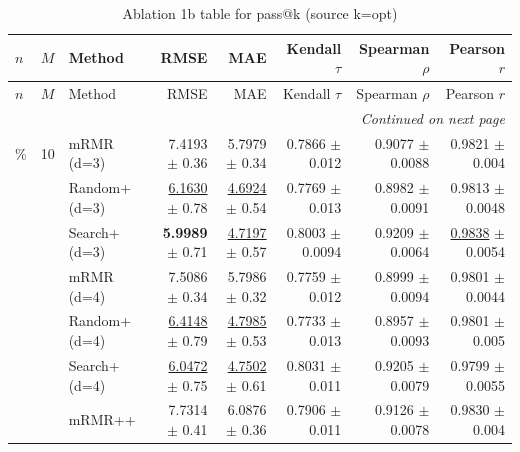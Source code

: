 \footnotesize
\setlength{\tabcolsep}{2pt}
\renewcommand{\arraystretch}{1.05}
\setlength{\LTpre}{0pt}
\setlength{\LTpost}{0pt}
\setlength{\LTleft}{\fill}
\setlength{\LTright}{\fill}
\begin{longtable}{llp{}rrrrr}
\caption{Ablation 1b table for pass@k (source k=opt)}\label{tab:ablation\_1b\_passk\_kopt}\\
\toprule
$n$ & $M$ & Method & RMSE & MAE & Kendall $\tau$ & Spearman $\rho$ & Pearson $r$ \\
\midrule
\endfirsthead
\toprule
$n$ & $M$ & Method & RMSE & MAE & Kendall $\tau$ & Spearman $\rho$ & Pearson $r$ \\
\midrule
\endhead
\midrule
\multicolumn{8}{r}{\emph{Continued on next page}} \\
\midrule
\endfoot
\bottomrule
\endlastfoot
5\% & 10 & mRMR (d=3) & 7.4193 {\scriptsize $\pm$ 0.36} & 5.7979 {\scriptsize $\pm$ 0.34} & 0.7866 {\scriptsize $\pm$ 0.012} & 0.9077 {\scriptsize $\pm$ 0.0088} & 0.9821 {\scriptsize $\pm$ 0.004} \\
 &  & Random+ (d=3) & \underline{6.1630} {\scriptsize $\pm$ 0.78} & \underline{4.6924} {\scriptsize $\pm$ 0.54} & 0.7769 {\scriptsize $\pm$ 0.013} & 0.8982 {\scriptsize $\pm$ 0.0091} & 0.9813 {\scriptsize $\pm$ 0.0048} \\
 &  & Search+ (d=3) & \textbf{5.9989} {\scriptsize $\pm$ 0.71} & \underline{4.7197} {\scriptsize $\pm$ 0.57} & 0.8003 {\scriptsize $\pm$ 0.0094} & 0.9209 {\scriptsize $\pm$ 0.0064} & \underline{0.9838} {\scriptsize $\pm$ 0.0054} \\
 &  & mRMR (d=4) & 7.5086 {\scriptsize $\pm$ 0.34} & 5.7986 {\scriptsize $\pm$ 0.32} & 0.7759 {\scriptsize $\pm$ 0.012} & 0.8999 {\scriptsize $\pm$ 0.0094} & 0.9801 {\scriptsize $\pm$ 0.0044} \\
 &  & Random+ (d=4) & \underline{6.4148} {\scriptsize $\pm$ 0.79} & \underline{4.7985} {\scriptsize $\pm$ 0.53} & 0.7733 {\scriptsize $\pm$ 0.013} & 0.8957 {\scriptsize $\pm$ 0.0093} & 0.9801 {\scriptsize $\pm$ 0.005} \\
 &  & Search+ (d=4) & \underline{6.0472} {\scriptsize $\pm$ 0.75} & \underline{4.7502} {\scriptsize $\pm$ 0.61} & 0.8031 {\scriptsize $\pm$ 0.011} & 0.9205 {\scriptsize $\pm$ 0.0079} & 0.9799 {\scriptsize $\pm$ 0.0055} \\
 &  & mRMR++ & 7.7314 {\scriptsize $\pm$ 0.41} & 6.0876 {\scriptsize $\pm$ 0.36} & 0.7906 {\scriptsize $\pm$ 0.011} & 0.9126 {\scriptsize $\pm$ 0.0078} & 0.9830 {\scriptsize $\pm$ 0.004} \\

\end{longtable}
